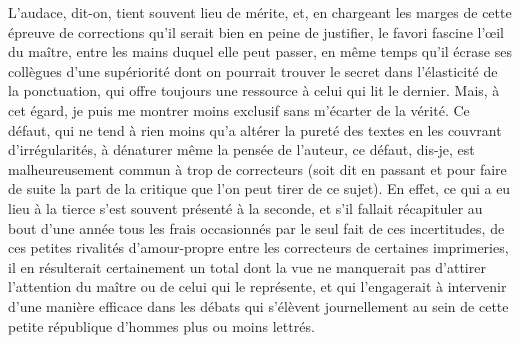 \documentclass[french,twoside]{book} %
\begin{document}
L’audace, dit-on, tient souvent lieu de mérite, et, en chargeant les marges de cette épreuve de corrections qu’il serait bien en peine de justifier, le favori fascine l’œil du maître, entre les mains duquel elle peut passer, en même temps qu’il écrase ses collègues d’une supériorité dont on pourrait trouver le secret dans l’élasticité de la ponctuation, qui offre toujours une ressource à celui qui lit le dernier. Mais, à cet égard, je puis me montrer moins exclusif sans m’écarter de la vérité. Ce défaut, qui ne tend  à rien moins qu’a altérer la pureté des textes en les couvrant d’irrégularités, à dénaturer même la pensée de l’auteur, ce défaut, dis-je, est malheureusement commun à trop de correcteurs (soit dit en passant et pour faire de suite la part de la critique que l’on peut tirer de ce sujet). En effet, ce qui a eu lieu à la tierce s’est souvent présenté à la seconde, et s’il fallait récapituler au bout d’une année tous les frais occasionnés par le seul fait de ces incertitudes, de ces petites rivalités d’amour-propre entre les correcteurs de certaines imprimeries, il en résulterait certainement un total dont la vue ne manquerait pas d’attirer l’attention du maître ou de celui qui le représente, et qui l’engagerait à intervenir d’une manière efficace dans les débats qui s’élèvent journellement au sein de cette petite république d’hommes plus ou moins lettrés.\par
\end{document}
